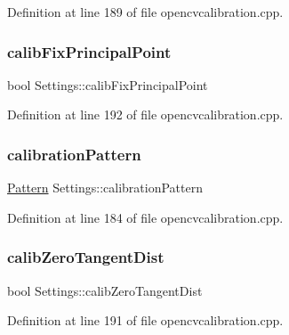 Definition at line 189 of file opencvcalibration.\+cpp.

\mbox{\label{classSettings_a44397eea3f08a0c78808c38bdd716594}} 
\subsubsection{\texorpdfstring{calibFixPrincipalPoint}{calibFixPrincipalPoint}}
{\footnotesize\ttfamily bool Settings\+::calib\+Fix\+Principal\+Point}



Definition at line 192 of file opencvcalibration.\+cpp.

\mbox{\label{classSettings_a94551b7ffe8ac60311b035b2905e9498}} 
\subsubsection{\texorpdfstring{calibrationPattern}{calibrationPattern}}
{\footnotesize\ttfamily \mbox{\hyperlink{classSettings_a0e7117abd9427a6f8bc1d1d8d456b5c8}{Pattern}} Settings\+::calibration\+Pattern}



Definition at line 184 of file opencvcalibration.\+cpp.

\mbox{\label{classSettings_a4bc7ff147d74721a3587ce6fcb64ef32}} 
\subsubsection{\texorpdfstring{calibZeroTangentDist}{calibZeroTangentDist}}
{\footnotesize\ttfamily bool Settings\+::calib\+Zero\+Tangent\+Dist}



Definition at line 191 of file opencvcalibration.\+cpp.

\mbox{\label{classSettings_af32a5ff06192bde106c934e0361bcd7e}} 
